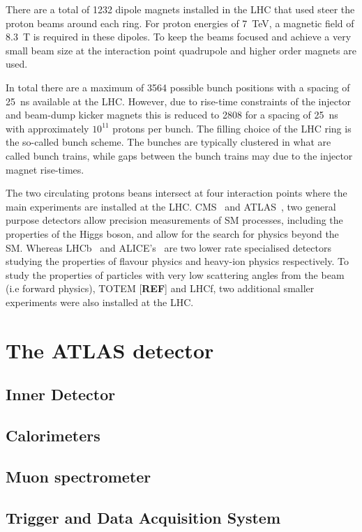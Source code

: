 There are a total of 1232 dipole magnets installed in the LHC that used steer the proton beams around each ring. 
For proton energies of \SI{7}{\tera\eV}, a magnetic field of \SI{8.3}{\tesla} is required in these dipoles.
To keep the beams focused and achieve a very small beam size at the interaction point quadrupole and higher order magnets are used. 

In total there are a maximum of 3564 possible bunch positions with a spacing of \SI{25}{\nano\second} available at the LHC. 
However, due to rise-time constraints of the injector and beam-dump kicker magnets this is reduced to 2808 for a spacing of \SI{25}{\nano\second} with approximately $10^{11}$ protons per bunch.
The filling choice of the LHC ring is the so-called bunch scheme. 
The bunches are typically clustered in what are called bunch trains, while gaps between the bunch trains may due to the injector magnet rise-times. 

The two circulating protons beans intersect at four interaction points where the main experiments are installed at the LHC. 
CMS~\cite{CMS} and ATLAS~\cite{ATLAS}, two general purpose detectors allow precision measurements of SM processes, including the properties of the Higgs boson, and allow for the search for physics beyond the SM.
Whereas LHCb~\cite{LHCb} and ALICE's~\cite{ALICE} are two lower rate specialised detectors studying the properties of flavour physics and heavy-ion physics respectively.
To study the properties of particles with very low scattering angles from the beam (i.e forward physics), TOTEM [\textbf{REF}] and LHCf, two additional smaller experiments were also installed at the LHC.

\section{The ATLAS detector}\label{sec:method:ATLAS}

\subsection{Inner Detector}

\subsection{Calorimeters}

\subsection{Muon spectrometer}

\subsection{Trigger and Data Acquisition System}